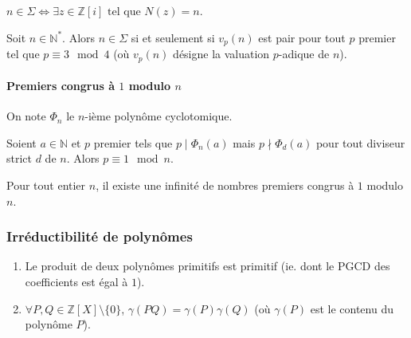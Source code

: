   \begin{remark}
    $n \in \Sigma \iff \exists z \in \mathbb{Z}[i] \text{ tel que } N(z)=n$.
  \end{remark}

  \begin{theorem}
    Soit $n \in \mathbb{N}^*$. Alors $n \in \Sigma$ si et seulement si $v_p(n)$ est pair pour tout $p$ premier tel que $p \equiv 3 \mod 4$ (où $v_p(n)$ désigne la valuation $p$-adique de $n$).
  \end{theorem}

  \paragraph{Premiers congrus à \texorpdfstring{$1$}{1} modulo \texorpdfstring{$n$}{n}}


  \begin{notation}
    On note $\Phi_n$ le $n$-ième polynôme cyclotomique.
  \end{notation}

  \begin{lemma}
    Soient $a \in \mathbb{N}$ et $p$ premier tels que $p \mid \Phi_n(a)$ mais $p \nmid \Phi_d(a)$ pour tout diviseur strict $d$ de $n$. Alors $p \equiv 1 \mod n$.
  \end{lemma}


  \begin{theorem}
    Pour tout entier $n$, il existe une infinité de nombres premiers congrus à $1$ modulo $n$.
  \end{theorem}

  \subsubsection{Irréductibilité de polynômes}


  \begin{lemma}
    \begin{enumerate}[label={\bfseries(\roman*)}]
      \item Le produit de deux polynômes primitifs est primitif (ie. dont le PGCD des coefficients est égal à $1$).
      \item $\forall P, Q \in \mathbb{Z}[X] \setminus \{ 0 \}$, $\gamma(PQ) = \gamma(P) \gamma(Q)$ (où $\gamma(P)$ est le contenu du polynôme $P$).
    \end{enumerate}
  \end{lemma}

